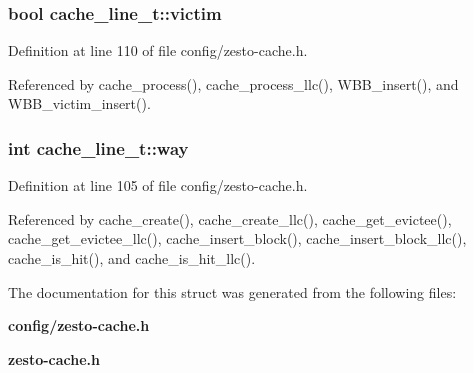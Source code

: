 \subsubsection[{victim}]{\setlength{\rightskip}{0pt plus 5cm}bool {\bf cache\_\-line\_\-t::victim}}\label{structcache__line__t_02960e1e2ae36127bdde6a060c807452}




Definition at line 110 of file config/zesto-cache.h.

Referenced by cache\_\-process(), cache\_\-process\_\-llc(), WBB\_\-insert(), and WBB\_\-victim\_\-insert().
\subsubsection[{way}]{\setlength{\rightskip}{0pt plus 5cm}int {\bf cache\_\-line\_\-t::way}}\label{structcache__line__t_48c894f63cad46a53fd267709d9e2ca8}




Definition at line 105 of file config/zesto-cache.h.

Referenced by cache\_\-create(), cache\_\-create\_\-llc(), cache\_\-get\_\-evictee(), cache\_\-get\_\-evictee\_\-llc(), cache\_\-insert\_\-block(), cache\_\-insert\_\-block\_\-llc(), cache\_\-is\_\-hit(), and cache\_\-is\_\-hit\_\-llc().

The documentation for this struct was generated from the following files:\begin{CompactItemize}
\item 
{\bf config/zesto-cache.h}\item 
{\bf zesto-cache.h}\end{CompactItemize}
